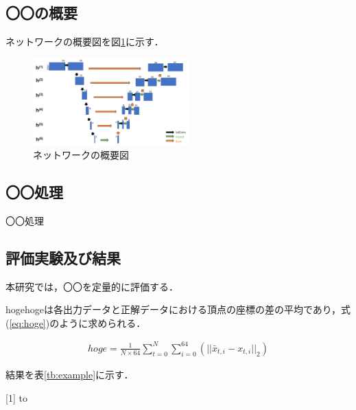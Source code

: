 \documentclass[twocolumn]{jarticle}
\begin{document}
\subsection{〇〇の概要}
\vspace{-2mm}

ネットワークの概要図を図\ref{tab:flowchart}に示す．

\begin{figure}[h]
 \begin{center}
  \includegraphics[width=6cm]{net_example.png}
  \caption{ネットワークの概要図}\label{tab:flowchart}
 \end{center}
\end{figure}

\vspace{-6mm}
\subsection{〇〇処理}
\vspace{-2mm}

〇〇処理

\vspace{-6mm}
\subsection{評価実験及び結果}
\vspace{-2mm}
本研究では，〇〇を定量的に評価する．

hogehogeは各出力データと正解データにおける頂点の座標の差の平均であり，式(\ref{eq:hoge})のように求められる．
\vspace{-6mm}

\begin{align}
hoge = \frac{1}{N\times64} \sum_{t=0}^N\sum_{i=0}^{64} (||\bar{x}_{t,i} -x_{t,i}||_2)
\label{eq:hoge}
\end{align}

\vspace{-2mm}

結果を表\ref{tb:example}に示す．
\begin{table}[h]
\caption{評価実験の結果} 
\label{tb:example}
\scalebox{1}[1]{
\hbox to}
\end{table}
\end{document}
